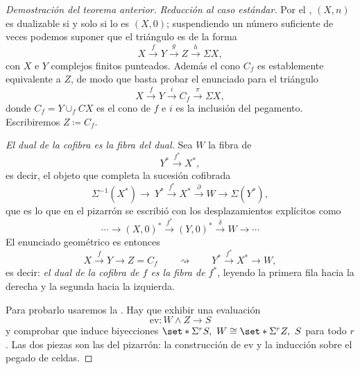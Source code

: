\begin{proof}[Demostración del teorema anterior]
\emph{Reducción al caso estándar.} Por el , $(X,n)$ es dualizable si y solo si lo es $(X,0)$; suspendiendo un número suficiente de veces podemos suponer que el triángulo es de la forma
\[
X\xrightarrow{\ f\ }Y\xrightarrow{\ g\ }Z\xrightarrow{\ h\ }\Sigma X ,
\]
con $X$ e $Y$ complejos finitos punteados. Además el cono $C_f$ es establemente equivalente a $Z$, de modo que basta probar el enunciado para el triángulo
\[
X\xrightarrow{\ f\ }Y\xrightarrow{\ i\ }C_f\xrightarrow{\ \pi\ }\Sigma X ,
\]
donde $C_f=Y\cup_f CX$ es el cono de $f$ e $i$ es la inclusión del pegamento. Escribiremos $Z\coloneqq C_f$.

\emph{El dual de la cofibra es la fibra del dual.} Sea $W$ la fibra de
\[
Y^*\xrightarrow{\ f^*\ }X^* ,
\]
es decir, el objeto que completa la sucesión cofibrada
\[
\Sigma^{-1}(X^*)\xrightarrow{\ \ }\ Y^*\xrightarrow{\ f^*\ }X^*\xrightarrow{\ \partial\ }W\xrightarrow{\ \ }\Sigma(Y^*) ,
\]
que es lo que en el pizarrón se escribió con los desplazamientos explícitos como
\[
\cdots\longrightarrow(X,0)^*\xrightarrow{\ f^*\ }(Y,0)^*\xrightarrow{\ \delta\ }W\longrightarrow\cdots
\]
El enunciado geométrico es entonces
\[
X\xrightarrow{\ f\ }Y\longrightarrow Z=C_f
\qquad\rightsquigarrow\qquad
Y^*\xrightarrow{\ f^*\ }X^*\longrightarrow W ,
\]
es decir: \emph{el dual de la cofibra de $f$ es la fibra de $f^*$}, leyendo la primera fila hacia la derecha y la segunda hacia la izquierda.

Para probarlo usaremos la . Hay que exhibir una evaluación
\[
\mathrm{ev}\colon W\wedge Z\longrightarrow S
\]
y comprobar que induce biyecciones $\set*{\Sigma^rS,\ W}\cong\set*{\Sigma^rZ,\ S}$ para todo $r$. Las dos piezas son las del pizarrón: la construcción de $\mathrm{ev}$ y la inducción sobre el pegado de celdas.


\end{proof}
